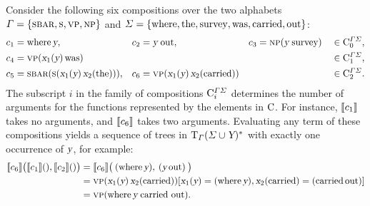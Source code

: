 \documentclass[../../document.tex]{subfiles}
\begin{document}
    \begin{example}\label{ex:dcp:comp}\NoEndMark
        Consider the following six  compositions over the two alphabets \(\varGamma = \{ \textsc{sbar}, \textsc{s}, \textsc{vp}, \textsc{np} \}\) and \(\varSigma = \{\text{where}, \text{the}, \text{survey}, \text{was}, \text{carried}, \text{out}\}\):
        \begin{align*}
            c_1 &= \text{where} \, \textsl{y},
            &c_2 &= \textsl{y} \; \text{out},
            &c_3 &= \textsc{np} (\textsl{y} \; \text{survey}) && \in \mathrm{C}^{\varGamma \varSigma}_0 \text{,}\\
            c_4 &= \textsc{vp}(\textsl{x}_1(\textsl{y}) \, \text{was}) && && && \in \mathrm{C}^{\varGamma \varSigma}_1 \text{,} \\
            c_5 &= \textsc{sbar} (\textsc{s} (\textsl{x}_1(\textsl{y}) \, \textsl{x}_2(\text{the}))),
            &c_6 &= \textsc{vp}(\textsl{x}_1(\textsl{y}) \, \textsl{x}_2(\text{carried})) && && \in \mathrm{C}^{\varGamma \varSigma}_2 \text{.}
        \end{align*}
        The subscript \(i\) in the family of  compositions \(\mathrm{C}^{\varGamma\varSigma}_i\) determines the number of arguments for the functions represented by the elements in \(\mathrm{C}\).
        For instance, \(\llbracket c_1\rrbracket\) takes no arguments, and \(\llbracket c_6\rrbracket\) takes two arguments.
        Evaluating any term of these compositions yields a sequence of trees in \(\operatorname{T}_\varGamma(\varSigma \cup \textsl{Y})^*\) with exactly one occurrence of \(\textsl{y}\), for example:
        \begin{align*}
            \llbracket c_6\rrbracket \big( \llbracket c_1\rrbracket(), \llbracket c_2\rrbracket() \big)
            &= \llbracket c_6\rrbracket \big( \: (\text{where} \, \textsl{y}), \: (\textsl{y} \, \text{out}) \: \big) \\
            &= \textsc{vp}(\textsl{x}_1(\textsl{y}) \, \textsl{x}_2(\text{carried}))[\textsl{x}_1(\textsl{y})=(\text{where} \, \textsl{y}), \textsl{x}_2(\text{carried})=(\text{carried}\, \text{out})] \\
            &= \textsc{vp}(\text{where} \, \textsl{y} \; \text{carried out}) \text{.}
        \end{align*}


\end{example}
\end{document}
